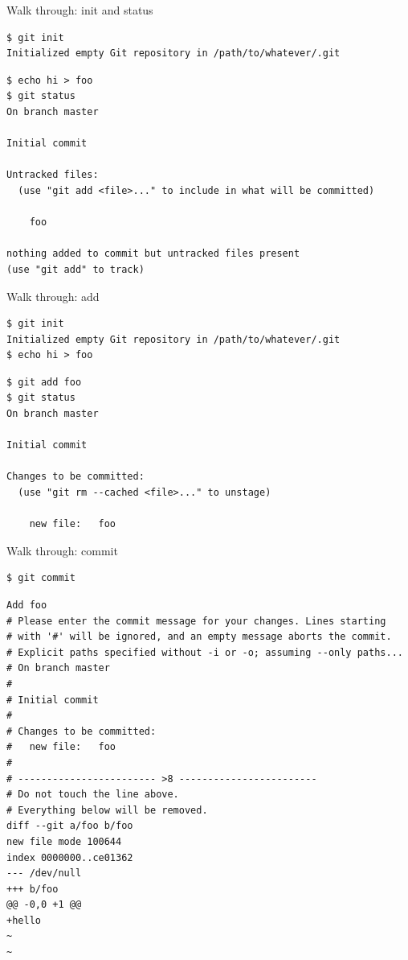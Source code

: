 \documentclass[xcolor=svgnames,17pt]{beamer}
\newcommand*{\sizefont}[1]{%
    \ifcase#1\relax
    \or \tiny
    \or \scriptsize
    \or \footnotesize
    \or \small
    \or \normalsize
    \or \large
    \or \Large
    \or \LARGE
    \or \huge
    \or \Huge
    \fi}
\begin{document}
\begin{frame}[fragile]{Walk through: init and status}
\sizefont{2}
\begin{verbatim}
$ git init
Initialized empty Git repository in /path/to/whatever/.git
\end{verbatim}
\pause
\begin{verbatim}
$ echo hi > foo
$ git status
On branch master

Initial commit

Untracked files:
  (use "git add <file>..." to include in what will be committed)

	foo

nothing added to commit but untracked files present
(use "git add" to track)
\end{verbatim}
\end{frame}

\begin{frame}[fragile]{Walk through: add}
\sizefont{2}
\begin{verbatim}
$ git init
Initialized empty Git repository in /path/to/whatever/.git
$ echo hi > foo
\end{verbatim}
\begin{verbatim}
$ git add foo
$ git status
On branch master

Initial commit

Changes to be committed:
  (use "git rm --cached <file>..." to unstage)

	new file:   foo

\end{verbatim}
\end{frame}

\begin{frame}[fragile]{Walk through: commit}
\sizefont{1}
\begin{verbatim}
$ git commit
\end{verbatim}
\pause
\begin{verbatim}
Add foo
# Please enter the commit message for your changes. Lines starting
# with '#' will be ignored, and an empty message aborts the commit.
# Explicit paths specified without -i or -o; assuming --only paths...
# On branch master
#
# Initial commit
#
# Changes to be committed:
#	new file:   foo
#
# ------------------------ >8 ------------------------
# Do not touch the line above.
# Everything below will be removed.
diff --git a/foo b/foo
new file mode 100644
index 0000000..ce01362
--- /dev/null
+++ b/foo
@@ -0,0 +1 @@
+hello
~
~
\end{verbatim}
\end{frame}
\end{document}
